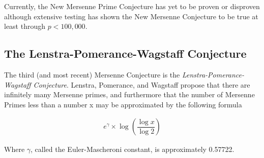 Currently, the New Mersenne Prime Conjecture has yet to be proven or disproven although extensive testing
has shown the New Mersenne Conjecture to be true at least through $p < 100,000$.

\subsection{The Lenstra-Pomerance-Wagstaff Conjecture}

The third (and most recent) Mersenne Conjecture is the \textit{Lenstra-Pomerance-Wagstaff Conjecture}. 
Lenstra, Pomerance, and Wagstaff propose that there are infinitely many Mersenne primes, and furthermore
that the number of Mersenne Primes less than a number x may be approximated by the following formula~\cite{utm.edu-heuristic}

\begin{align}
e^{\gamma} \times \log \left( \dfrac{\log{x}}{\log{2}} \right)
\end{align}

Where $\gamma$, called the Euler-Mascheroni constant, is approximately 0.57722.
